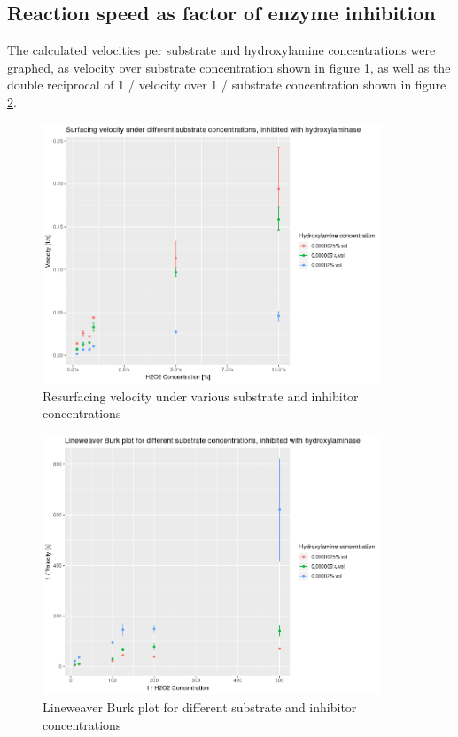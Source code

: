 \documentclass[a4paper,english]{scrreprt}
\begin{document}
\subsection{Reaction speed as factor of enzyme inhibition}

The calculated velocities per substrate and hydroxylamine concentrations were
graphed, as velocity over substrate concentration shown in figure
\ref{fig:inhibition}, as well as the double reciprocal of 1 / velocity over
1 / substrate concentration shown in
figure \ref{fig:inhibition_lburk}.

\begin{figure}
	\centering
	\includegraphics[width=0.9\textwidth]{img/inhibition.png}
	\caption{Resurfacing velocity under various substrate and inhibitor concentrations}
	\label{fig:inhibition}
\end{figure}

\begin{figure}
	\centering
	\includegraphics[width=0.9\textwidth]{img/inhibition_lburk.png}
	\caption{Lineweaver Burk plot for different substrate and inhibitor concentrations}
	\label{fig:inhibition_lburk}
\end{figure}
\end{document}

